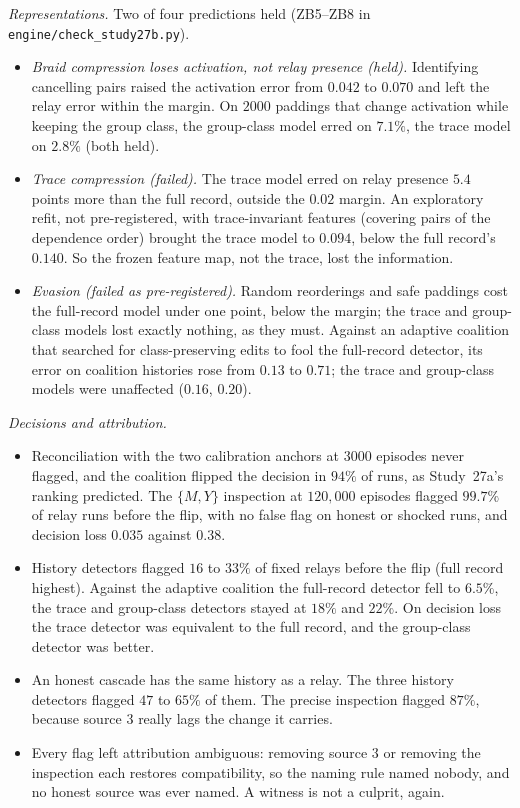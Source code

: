 \documentclass[11pt]{article}
\theoremstyle{definition}\newtheorem{definition}[theorem]{Definition}\newtheorem{remark}[theorem]{Remark}\newtheorem{example}[theorem]{Example}\newtheorem{problem}[theorem]{Open problem}\crefname{problem}{Problem}{Problems}
\begin{document}
\emph{Representations.} Two of four predictions held (ZB5--ZB8 in \texttt{engine/check\_study27b.py}).
\begin{itemize}
\item \emph{Braid compression loses activation, not relay presence (held).} Identifying cancelling pairs raised the activation error from $0.042$ to $0.070$ and left the relay error within the margin. On $2000$ paddings that change activation while keeping the group class, the group-class model erred on $7.1\%$, the trace model on $2.8\%$ (both held).
\item \emph{Trace compression (failed).} The trace model erred on relay presence $5.4$ points more than the full record, outside the $0.02$ margin. An exploratory refit, not pre-registered, with trace-invariant features (covering pairs of the dependence order) brought the trace model to $0.094$, below the full record's $0.140$. So the frozen feature map, not the trace, lost the information.
\item \emph{Evasion (failed as pre-registered).} Random reorderings and safe paddings cost the full-record model under one point, below the margin; the trace and group-class models lost exactly nothing, as they must. Against an adaptive coalition that searched for class-preserving edits to fool the full-record detector, its error on coalition histories rose from $0.13$ to $0.71$; the trace and group-class models were unaffected ($0.16$, $0.20$).
\end{itemize}

\emph{Decisions and attribution.}
\begin{itemize}
\item Reconciliation with the two calibration anchors at $3000$ episodes never flagged, and the coalition flipped the decision in $94\%$ of runs, as Study~27a's ranking predicted. The $\{M,Y\}$ inspection at $120{,}000$ episodes flagged $99.7\%$ of relay runs before the flip, with no false flag on honest or shocked runs, and decision loss $0.035$ against $0.38$.
\item History detectors flagged $16$ to $33\%$ of fixed relays before the flip (full record highest). Against the adaptive coalition the full-record detector fell to $6.5\%$, the trace and group-class detectors stayed at $18\%$ and $22\%$. On decision loss the trace detector was equivalent to the full record, and the group-class detector was better.
\item An honest cascade has the same history as a relay. The three history detectors flagged $47$ to $65\%$ of them. The precise inspection flagged $87\%$, because source $3$ really lags the change it carries.
\item Every flag left attribution ambiguous: removing source $3$ or removing the inspection each restores compatibility, so the naming rule named nobody, and no honest source was ever named. A witness is not a culprit, again.
\end{itemize}
\end{document}
